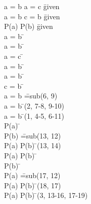 \documentclass{article}
\begin{document}
\begin{proofbox}
\: a = b \lor a = c \= \hbox{given} \\
\: a = b \lor c = b \= \hbox{given} \\
\: P(a) \lor P(b) \= \hbox{given} \\
\openAlt
\: a = b \= \asm \\
\: a = b \=  \\
\splitAlt
\: a = c \= \asm \\
\openAlt
\: a = b \= \asm \\
\: a = b \=  \\
\splitAlt
\: c = b \= \asm \\
\: a = b \= =\hbox{sub}(6, 9) \\
\closeAlt
\: a = b \= \orelim(2, 7-8, 9-10) \\
\closeAlt
\: a = b \= \orelim(1, 4-5, 6-11) \\
\openAlt
\: P(a) \= \asm \\
\: P(b) \= =\hbox{sub}(13, 12) \\
\: P(a) \land P(b) \= \andintro(13, 14) \\
\: P(a) \land P(b) \=  \\
\splitAlt
\: P(b) \= \asm \\
\: P(a) \= =\hbox{sub}(17, 12) \\
\: P(a) \land P(b) \= \andintro(18, 17) \\
\closeAlt
\: P(a) \land P(b) \= \orelim(3, 13-16, 17-19) \\
\end{proofbox}
\end{document}
